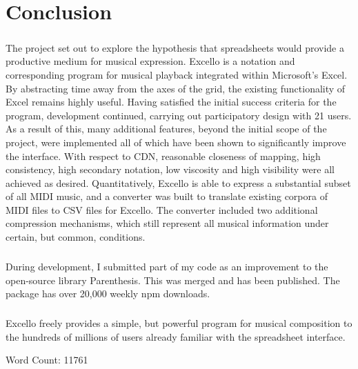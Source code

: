 
\chapter{Conclusion}

\paragraph{} The project set out to explore the hypothesis that spreadsheets would provide a productive medium for musical expression. Excello is a notation and corresponding program for musical playback integrated within Microsoft's Excel. By abstracting time away from the axes of the grid, the existing functionality of Excel remains highly useful. Having satisfied the initial success criteria for the program, development continued, carrying out participatory design with 21 users. As a result of this, many additional features, beyond the initial scope of the project, were implemented all of which have been shown to significantly improve the interface. With respect to CDN, reasonable closeness of mapping, high consistency, high secondary notation, low viscosity and high visibility were all achieved as desired. Quantitatively, Excello is able to express a substantial subset of all  MIDI music, and a converter was built to translate existing corpora of MIDI files to CSV files for Excello. The converter included two additional compression mechanisms, which still represent all musical information under certain, but common, conditions.

\paragraph{} During development, I submitted part of my code as an improvement to the open-source library Parenthesis. This was merged and has been published. The package has over 20,000 weekly npm downloads.

\paragraph{} Excello freely provides a simple, but powerful program for musical composition to the hundreds of millions of users already familiar with the spreadsheet interface. \\

\begin{flushright}
Word Count: 11761
\end{flushright}
